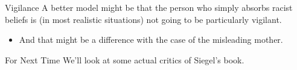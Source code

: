 \documentclass[
  17pt,
  letterpaper,
  ignorenonframetext,
  aspectratio=169,
  handout,
  xcolor={dvipsnames}]{beamer}
\providecommand{\tightlist}{%
  \setlength{\itemsep}{0pt}\setlength{\parskip}{0pt}}\usepackage{longtable,booktabs,array}
\begin{document}
\begin{frame}{Vigilance}
\protect\hypertarget{vigilance}{}
A better model might be that the person who simply absorbs racist
beliefs is (in most realistic situations) not going to be particularly
vigilant.

\begin{itemize}[<+->]
\tightlist
\item
  And that might be a difference with the case of the misleading mother.
\end{itemize}
\end{frame}

\begin{frame}{For Next Time}
\protect\hypertarget{for-next-time}{}
We'll look at some actual critics of Siegel's book.
\end{frame}
\end{document}
